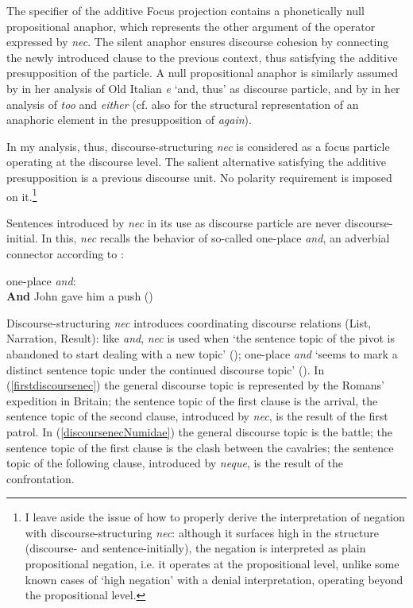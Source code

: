 \documentclass[output=paper,modfonts,nonflat,citecolor=brown,
showindex
]{langsci/langscibook}
\begin{document}
The specifier of the additive Focus projection contains a phonetically null propositional anaphor, which represents the other argument of the operator expressed by {\emph{nec}}. The silent anaphor ensures discourse cohesion by connecting the newly introduced clause to the previous context, thus satisfying the additive presupposition of the particle. A null propositional anaphor is similarly assumed by \citet[22-27]{Poletto14} in her analysis of Old Italian {\emph{e}} `and, thus' as discourse particle, and by \citet{Ahn15} in her analysis of {\emph{too}} and {\emph{either}} (cf. also \citealt[]{Beck06} for the structural representation of an anaphoric element in the presupposition of {\emph{again}}). 

In my analysis, thus, discourse-structuring {\emph{nec}} is considered as a focus particle operating at the discourse level. The salient alternative satisfying the additive presupposition is a previous discourse unit. No polarity requirement is imposed on it.{\footnote{I leave aside the issue of how to properly derive the interpretation of negation with discourse-structuring {\emph{nec}}: although it surfaces high in the structure (discourse- and sentence-initially), the negation is interpreted as plain propositional negation, i.e. it operates at the propositional level, unlike some known cases of `high negation' with a denial interpretation, operating beyond the propositional level.}} 
 
Sentences introduced by {\emph{nec}} in its use as discourse particle are never discourse-initial. In this, {\emph{nec}} recalls the behavior of so-called one-place {\emph{and}}, an adverbial connector according to \citet[]{ZeevatJasinskaja07}: 
 
{\begin{exe}
\ex one-place {\emph{and}}:\\
{\textbf{And}} John gave him a push (\citealt[their ex. 7]{ZeevatJasinskaja07})
\end{exe}}
 
 \noindent Discourse-structuring {\emph{nec}} introduces coordinating discourse relations (List, Narration, Result): like {\emph{and}}, {\emph{nec}} is used when `the sentence topic of the pivot is abandoned to start dealing with a new topic' (\citealt[325]{ZeevatJasinskaja07}); one-place {\emph{and}} `seems to mark a distinct sentence topic under the continued discourse topic' (\citealt[325]{ZeevatJasinskaja07}). In (\ref{firstdiscoursenec}) the general discourse topic is represented by the Romans' expedition in Britain; the sentence topic of the first clause is the arrival, the sentence topic of the second clause, introduced by {\emph{nec}}, is the result of the first patrol. In (\ref{discoursenecNumidae}) the general discourse topic is the battle; the sentence topic of the first clause is the clash between the cavalries; the sentence topic of the following clause, introduced by {\emph{neque}}, is the result of the confrontation. 
 
\end{document}

